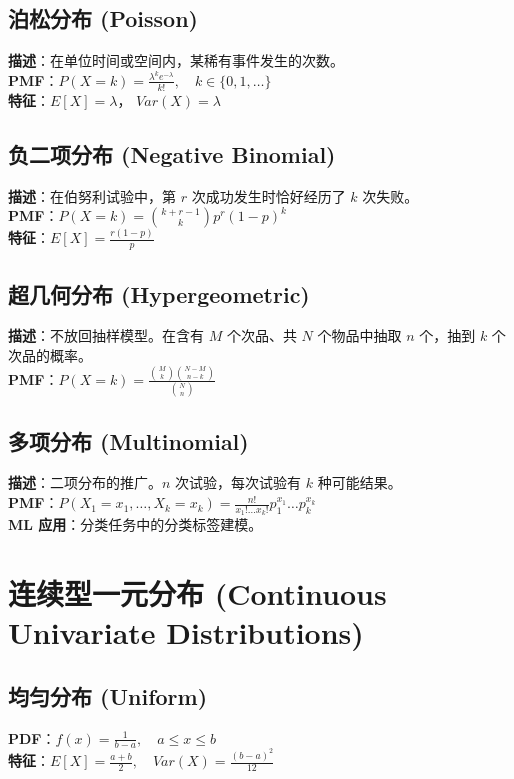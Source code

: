 \documentclass[12pt, a4paper]{article}
\begin{document}
\subsection{泊松分布 (Poisson)}
\textbf{描述}：在单位时间或空间内，某稀有事件发生的次数。
\\ \textbf{PMF}：$P(X=k) = \frac{\lambda^k e^{-\lambda}}{k!}, \quad k \in \{0, 1, \dots\}$
\\ \textbf{特征}：$E[X] = \lambda$， $Var(X) = \lambda$

\subsection{负二项分布 (Negative Binomial)}
\textbf{描述}：在伯努利试验中，第 $r$ 次成功发生时恰好经历了 $k$ 次失败。
\\ \textbf{PMF}：$P(X=k) = \binom{k+r-1}{k} p^r(1-p)^k$
\\ \textbf{特征}：$E[X] = \frac{r(1-p)}{p}$

\subsection{超几何分布 (Hypergeometric)}
\textbf{描述}：不放回抽样模型。在含有 $M$ 个次品、共 $N$ 个物品中抽取 $n$ 个，抽到 $k$ 个次品的概率。
\\ \textbf{PMF}：$P(X=k) = \frac{\binom{M}{k}\binom{N-M}{n-k}}{\binom{N}{n}}$

\subsection{多项分布 (Multinomial)}
\textbf{描述}：二项分布的推广。$n$ 次试验，每次试验有 $k$ 种可能结果。
\\ \textbf{PMF}：$P(X_1=x_1, \dots, X_k=x_k) = \frac{n!}{x_1! \dots x_k!} p_1^{x_1} \dots p_k^{x_k}$
\\ \textbf{ML 应用}：分类任务中的分类标签建模。

\section{连续型一元分布 (Continuous Univariate Distributions)}

\subsection{均匀分布 (Uniform)}
\textbf{PDF}：$f(x) = \frac{1}{b-a}, \quad a \le x \le b$
\\ \textbf{特征}：$E[X] = \frac{a+b}{2}, \quad Var(X) = \frac{(b-a)^2}{12}$
\end{document}
